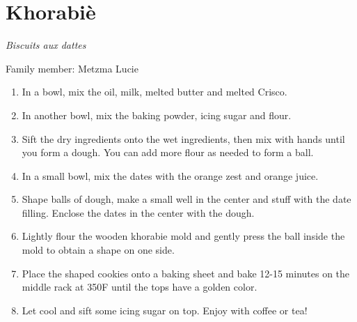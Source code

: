 \chapter{Khorabiè}
\label{ch:khorabie}


\textit{Biscuits aux dattes}

Family member: Metzma Lucie



\begin{enumerate}
    \item In a bowl, mix the oil, milk, melted butter and melted Crisco.
    \item In another bowl, mix the baking powder, icing sugar and flour.
    \item Sift the dry ingredients onto the wet ingredients, then mix with hands until you form a dough. You can add more flour as needed to form a ball.
    \item In a small bowl, mix the dates with the orange zest and orange juice.
    \item Shape balls of dough, make a small well in the center and stuff with the date filling. Enclose the dates in the center with the dough.
    \item Lightly flour the wooden khorabie mold and gently press the ball inside the mold to obtain a shape on one side.
    \item Place the shaped cookies onto a baking sheet and bake 12-15 minutes on the middle rack at 350\degree F until the tops have a golden color.
    \item Let cool and sift some icing sugar on top. Enjoy with coffee or tea!
\end{enumerate}
